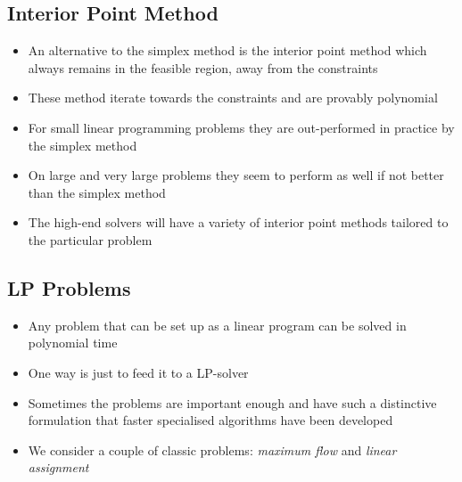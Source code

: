
\begin{slide}
\section[-2]{Interior Point Method}

\begin{PauseHighLight}
  \begin{itemize}
  \item An alternative to the simplex method is the interior point
    method which always remains in the feasible region, away from the
    constraints\pause
  \item These method iterate towards the constraints and are provably
    polynomial\pause
  \item For small linear programming problems they are out-performed in
    practice by the simplex method\pause
  \item On large and very large problems they seem to perform as well if
    not better than the simplex method\pause
  \item The high-end solvers will have a variety of interior point
    methods tailored to the particular problem\pause
  \end{itemize}
\end{PauseHighLight}

\end{slide}

\Outline %

\begin{slide}
\section{LP Problems}

\begin{PauseHighLight}
  \begin{itemize}
  \item Any problem that can be set up as a linear program can be solved
    in polynomial time\pause
  \item One way is just to feed it to a LP-solver\pause
  \item Sometimes the problems are important enough and have such a
    distinctive formulation that faster specialised algorithms have been
    developed\pause
  \item We consider a couple of classic problems: \textit{maximum flow}
    and \textit{linear assignment}\pause
  \end{itemize}
\end{PauseHighLight}

\end{slide}

